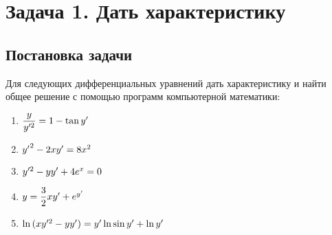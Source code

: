 

\section{Задача 1. Дать характеристику}
\subsection{Постановка задачи}
Для следующих дифференциальных уравнений дать характеристику и найти
общее решение с помощью программ компьютерной математики:

\begin{enumerate}
    \item $ \dfrac{y}{y'^2} = 1 - \tan{y'} $
    \item $ {y'}^2 - 2xy' = 8x^2 $
    \item $ {y'^2 - yy' + 4e^x = 0} $
    \item $ y = \dfrac{3}{2}xy' + e^{y'} $
    \item $ \ln{(xy'^2 - yy')} = y'\ln{\sin{y'} + \ln{y'}} $
\end{enumerate}

